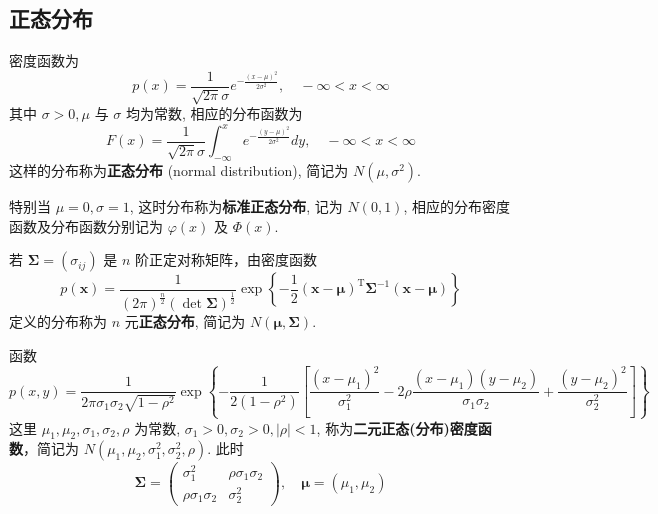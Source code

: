 \subsection{正态分布}\label{subsec:正态分布}
\begin{definition} [正态分布] 
   密度函数为
\begin{equation} \label{eq:normal_pdf}
p(x)=\frac{1}{\sqrt{2\pi}\sigma}e^{-\frac{(x-\mu)^2}{2\sigma^2}}, \quad -\infty<x<\infty
\end{equation}
其中 $\sigma>0, \mu$ 与 $\sigma$ 均为常数, 相应的分布函数为
\begin{equation} \label{eq:normal_cdf}
F(x) = \frac{1}{\sqrt{2\pi}\sigma}\int_{-\infty}^x e^{-\frac{(y-\mu)^2}{2\sigma^2}} dy, \quad -\infty<x<\infty
\end{equation}
这样的分布称为\textbf{正态分布} (normal distribution), 简记为 $N(\mu,\sigma^2)$.

特别当 $\mu=0, \sigma=1$, 这时分布称为\textbf{标准正态分布}, 记为 $N(0,1)$, 相应的分布密度函数及分布函数分别记为 $\varphi(x)$ 及 $\Phi(x)$.
\end{definition}
\begin{definition}[多元正态分布]\label{def:多元正态分布}
    若 $\boldsymbol{\Sigma}=(\sigma_{ij})$ 是 $n$ 阶正定对称矩阵，由密度函数
\begin{equation} \label{eq:multivariate_normal_pdf_vector}
p(\boldsymbol{x})=\frac{1}{(2\pi)^{\frac{n}{2}}(\det \boldsymbol{\Sigma})^{\frac{1}{2}}}\exp\left\{-\frac{1}{2}(\boldsymbol{x}-\boldsymbol{\mu})^{\text{T}}\boldsymbol{\Sigma}^{-1}(\boldsymbol{x}-\boldsymbol{\mu})\right\}
\end{equation}
定义的分布称为 $n$ 元\textbf{正态分布}, 简记为 $N(\boldsymbol{\mu},\boldsymbol{\Sigma})$.
\end{definition}
\begin{example}[ 二元正态分布]\label{ex:二元正态分布}
    函数
\begin{equation} \label{eq:bivariate_normal_pdf}
p(x,y) = \frac{1}{2\pi\sigma_1\sigma_2\sqrt{1-\rho^2}} \exp\left\{-\frac{1}{2(1-\rho^2)}\left[\frac{(x-\mu_1)^2}{\sigma_1^2} - 2\rho\frac{(x-\mu_1)(y-\mu_2)}{\sigma_1\sigma_2} + \frac{(y-\mu_2)^2}{\sigma_2^2}\right]\right\}
\end{equation}
这里 $\mu_1,\mu_2,\sigma_1,\sigma_2,\rho$ 为常数, $\sigma_1 > 0, \sigma_2 > 0, |\rho| < 1$, 称为\textbf{二元正态(分布)密度函数}，简记为 $N(\mu_1,\mu_2,\sigma_1^2,\sigma_2^2,\rho)$.
此时
\[
\boldsymbol{\Sigma} = \begin{pmatrix} \sigma_1^2 & \rho\sigma_1\sigma_2 \\ \rho\sigma_1\sigma_2 & \sigma_2^2 \end{pmatrix}, \quad \boldsymbol{\mu} = (\mu_1,\mu_2)
\]
\end{example}
